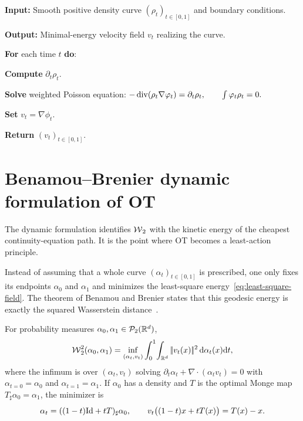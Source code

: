 \begin{alg}\label{alg:least-square-velocity-reconstruction}
\textbf{Input:} Smooth positive density curve $(\rho_t)_{t\in[0,1]}$ and boundary conditions.

\textbf{Output:} Minimal-energy velocity field $v_t$ realizing the curve.

\textbf{For} each time $t$ \textbf{do}:
\begin{algblock}

\textbf{Compute} $\partial_t\rho_t$.

\textbf{Solve} weighted Poisson equation:
\(-\operatorname{div}(\rho_t\nabla\varphi_t)=\partial_t\rho_t, \qquad \int\varphi_t\rho_t=0.\)

\textbf{Set}
\(v_t=\nabla\phi_t .\)
\end{algblock}
\algreturnskip
\textbf{Return} $(v_t)_{t\in[0,1]}$.
\end{alg}

\section{Benamou--Brenier dynamic formulation of OT}
\label{sec-benamou-brenier-dynamic}

The dynamic formulation identifies $\operatorname{\mathcal{W}}_2$ with the kinetic energy of the cheapest continuity-equation path. It is the point where OT becomes a least-action principle.

Instead of assuming that a whole curve $(\alpha_t)_{t\in[0,1]}$ is prescribed, one only fixes its endpoints $\alpha_0$ and $\alpha_1$ and minimizes the least-square energy~\eqref{eq:least-square-field}. The theorem of Benamou and Brenier states that this geodesic energy is exactly the squared Wasserstein distance~\cite{benamou2000computational}.

\begin{thm}\label{thm-benamou-brenier}
	For probability measures $\alpha_0,\alpha_1\in\mathcal{P}_2(\mathbb{R}^d)$,
	\begin{equation}\label{eq:benamou-brenier}
	\operatorname{\mathcal{W}}_2^2(\alpha_0,\alpha_1)
	=
	\inf_{(\alpha_t,v_t)}
	\int_0^1\!\int_{\mathbb{R}^d}|\!| v_t(x) |\!|^2\,\mathrm{d}\alpha_t(x)\mathrm{d} t,
	\end{equation}
	where the infimum is over $(\alpha_t,v_t)$ solving $\partial_t\alpha_t+\nabla\!\cdot(\alpha_t v_t)=0$ with $\alpha_{t=0}=\alpha_0$ and $\alpha_{t=1}=\alpha_1$. If $\alpha_0$ has a density and $T$ is the optimal Monge map $T_\sharp\alpha_0=\alpha_1$, the minimizer is
	\begin{equation}\label{eq:static-to-dynamic}
		\alpha_t=((1-t)\mathrm{Id}+tT)_\sharp\alpha_0,
		\qquad
		v_t\big((1-t)x+tT(x)\big)=T(x)-x.
	\end{equation}
\end{thm}

